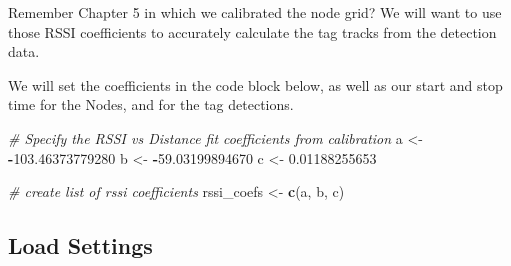 \documentclass[
]{book}
\newenvironment{Shaded}{\begin{snugshade}}{\end{snugshade}}
\newcommand{\CommentTok}[1]{\textcolor[rgb]{0.56,0.35,0.01}{\textit{#1}}}
\newcommand{\FloatTok}[1]{\textcolor[rgb]{0.00,0.00,0.81}{#1}}
\newcommand{\FunctionTok}[1]{\textcolor[rgb]{0.13,0.29,0.53}{\textbf{#1}}}
\newcommand{\NormalTok}[1]{#1}
\newcommand{\OtherTok}[1]{\textcolor[rgb]{0.56,0.35,0.01}{#1}}
\newcommand{\SpecialCharTok}[1]{\textcolor[rgb]{0.81,0.36,0.00}{\textbf{#1}}}
\begin{document}
Remember Chapter 5 in which we calibrated the node grid? We will want to use those RSSI coefficients to accurately calculate the tag tracks from the detection data.

We will set the coefficients in the code block below, as well as our start and stop time for the Nodes, and for the tag detections.

\begin{Shaded}
\begin{Highlighting}[]
\CommentTok{\# Specify the RSSI vs Distance fit coefficients from calibration}
\NormalTok{a }\OtherTok{\textless{}{-}} \SpecialCharTok{{-}}\FloatTok{103.46373779280}
\NormalTok{b }\OtherTok{\textless{}{-}} \SpecialCharTok{{-}}\FloatTok{59.03199894670}
\NormalTok{c }\OtherTok{\textless{}{-}} \FloatTok{0.01188255653}

\CommentTok{\# create list of rssi coefficients}
\NormalTok{rssi\_coefs }\OtherTok{\textless{}{-}} \FunctionTok{c}\NormalTok{(a, b, c)}
\end{Highlighting}
\end{Shaded}

\subsection{Load Settings}\label{load-settings-2}
\end{document}
